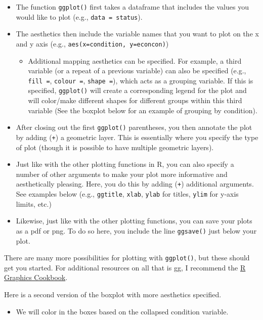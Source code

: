 \documentclass[
  letterpaper,
  DIV=11,
  numbers=noendperiod]{scrreprt}
\providecommand{\tightlist}{%
  \setlength{\itemsep}{0pt}\setlength{\parskip}{0pt}}\usepackage{longtable,booktabs,array}
\begin{document}
\begin{itemize}
\tightlist
\item
  The function \texttt{ggplot()} first takes a dataframe that includes
  the values you would like to plot (e.g., \texttt{data\ =\ status}).
\item
  The aesthetics then include the variable names that you want to plot
  on the x and y axis (e.g., \texttt{aes(x=condition,\ y=econcon)})

  \begin{itemize}
  \tightlist
  \item
    Additional mapping aesthetics can be specified. For example, a third
    variable (or a repeat of a previous variable) can also be specified
    (e.g., \texttt{fill\ =}, \texttt{colour\ =}, \texttt{shape\ =}),
    which acts as a grouping variable. If this is specified,
    \texttt{ggplot()} will create a corresponding legend for the plot
    and will color/make different shapes for different groups within
    this third variable (See the boxplot below for an example of
    grouping by condition).
  \end{itemize}
\item
  After closing out the first \texttt{ggplot()} parentheses, you then
  annotate the plot by adding (\texttt{+}) a geometric layer. This is
  essentially where you specify the type of plot (though it is possible
  to have multiple geometric layers).
\item
  Just like with the other plotting functions in R, you can also specify
  a number of other arguments to make your plot more informative and
  aesthetically pleasing. Here, you do this by adding (\texttt{+})
  additional arguments. See examples below (e.g., \texttt{ggtitle},
  \texttt{xlab}, \texttt{ylab} for titles, \texttt{ylim} for y-axis
  limits, etc.)
\item
  Likewise, just like with the other plotting functions, you can save
  your plots as a pdf or png. To do so here, you include the line
  \texttt{ggsave()} just below your plot.
\end{itemize}

There are many more possibilities for plotting with \texttt{ggplot()},
but these should get you started. For additional resources on all that
is gg, I recommend the \href{https://\%20r-graphics.org/}{R Graphics
Cookbook}.

Here is a second version of the boxplot with more aesthetics specified.

\begin{itemize}
\tightlist
\item
  We will color in the boxes based on the collapsed condition variable.
\end{itemize}
\end{document}
